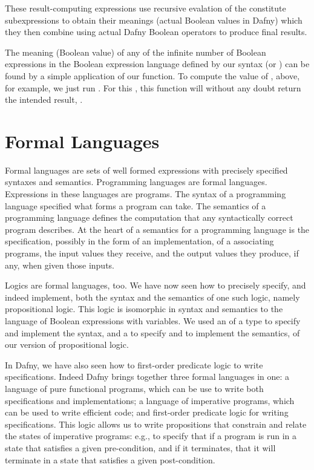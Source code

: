 \documentclass[letterpaper,10pt,english]{sphinxmanual}
\begin{document}
These result-computing expressions use recursive evalation of the
constitute subexpressions to obtain their meanings (actual Boolean
values in Dafny) which they then combine using actual Dafny Boolean
operators to produce final results.

The meaning (Boolean value) of any of the infinite number of Boolean
expressions in the Boolean expression language defined by our syntax
(or ) can be found by a simple application of our 
function. To compute the value of , above, for example, we just run
. For this , this function will without any doubt return
the intended result, .


\section{Formal Languages}
\label{\detokenize{10-formal-languages:id1}}
Formal languages are sets of well formed expressions with precisely
specified syntaxes and semantics.  Programming languages are formal
languages. Expressions in these languages are programs. The syntax of
a programming language specified what forms a program can take.  The
semantics of a programming language defines the computation that any
syntactically correct program describes. At the heart of a semantics
for a programming language is the specification, possibly in the form
of an implementation, of a  associating programs, the input
values they receive, and the output values they produce, if any, when
given those inputs.

Logics are formal languages, too. We have now seen how to precisely
specify, and indeed implement, both the syntax and the semantics of
one such logic, namely propositional logic. This logic is isomorphic
in syntax and semantics to the language of Boolean expressions with
variables. We used an  of a type to specify and
implement the syntax, and a  to specify and to
implement the semantics, of our version of propositional logic.

In Dafny, we have also seen how to  first-order predicate logic
to write specifications. Indeed Dafny brings together three formal
languages in one: a language of pure functional programs, which can be
use to write both specifications and implementations; a language of
imperative programs, which can be used to write efficient code; and
first-order predicate logic for writing specifications. This logic
allows us to write propositions that constrain and relate the states
of imperative programs: e.g., to specify that if a program is run in a
state that satisfies a given pre-condition, and if it terminates, that
it will terminate in a state that satisfies a given post-condition.
\end{document}
